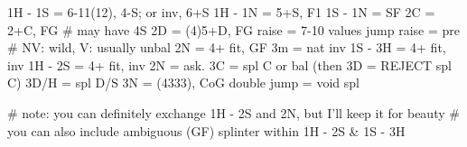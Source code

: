 1H - 1S = 6-11(12), 4-S; or inv, 6+S
1H - 1N = 5+S, F1
1S - 1N = SF
2C = 2+C, FG  # may have 4S
2D = (4)5+D, FG
raise = 7-10 values
jump raise = pre  # NV: wild, V: usually unbal
2N = 4+ fit, GF 
3m = nat inv
1S - 3H = 4+ fit, inv
1H - 2S = 4+ fit, inv
    2N = ask.
        3C = spl C or bal (then 3D = REJECT spl C)
        3D/H = spl D/S
3N = (4333), CoG
double jump = void spl

# note: you can definitely exchange 1H - 2S and 2N, but I'll keep it for beauty
# you can also include ambiguous (GF) splinter within 1H - 2S & 1S - 3H